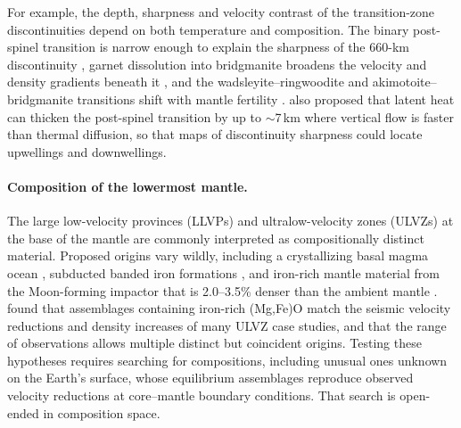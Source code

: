 For example, the depth, sharpness and velocity contrast of the transition-zone discontinuities depend on both temperature and composition. 
The binary post-spinel transition is narrow enough to explain the sharpness of the 660-km discontinuity \citep{ishii2019}, garnet dissolution into bridgmanite broadens the velocity and
density gradients beneath it \citep{wood1996}, and the wadsleyite--ringwoodite and akimotoite--bridgmanite transitions shift with
mantle fertility \citep{hartmeier2026}. \citet{ishii2019} also proposed that latent heat can thicken the post-spinel transition by up
to $\sim$7\,km where vertical flow is faster than thermal diffusion, so that maps of discontinuity sharpness could locate upwellings
and downwellings.

\paragraph{Composition of the lowermost mantle.} The large low-velocity provinces (LLVPs) and ultralow-velocity zones (ULVZs) at the
base of the mantle are commonly interpreted as compositionally distinct material. Proposed origins vary wildly, including a crystallizing basal
magma ocean \citep{labrosse2007}, subducted banded iron formations \citep{dobson2005}, and iron-rich mantle material from the
Moon-forming impactor that is 2.0--3.5\% denser than the ambient mantle \citep{yuan2023}. \citet{jackson2021} found that assemblages
containing iron-rich (Mg,Fe)O match the seismic velocity reductions and density increases of many ULVZ case studies, and that the
range of observations allows multiple distinct but coincident origins. Testing these hypotheses requires searching for compositions,
including unusual ones unknown on the Earth's surface, whose equilibrium assemblages reproduce observed velocity reductions at core--mantle boundary conditions.
That search is open-ended in composition space.


